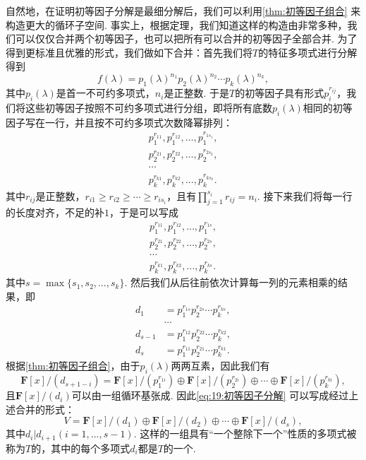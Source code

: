 自然地，在证明初等因子分解是最细分解后，我们可以利用\autoref{thm:初等因子组合} 来构造更大的循环子空间. 事实上，根据定理，我们知道这样的构造由非常多种，我们可以仅仅合并两个初等因子，也可以把所有可以合并的初等因子全部合并. 为了得到更标准且优雅的形式，我们做如下合并：首先我们将$T$的特征多项式进行分解得到
\[f(\lambda)=p_1(\lambda)^{n_1}p_2(\lambda)^{n_2}\cdots p_k(\lambda)^{n_k},\]
其中$p_i(\lambda)$是首一不可约多项式，$n_i$是正整数. 于是$T$的初等因子具有形式$p_i^{r_{ij}}$，我们将这些初等因子按照不可约多项式进行分组，即将所有底数$p_i(\lambda)$相同的初等因子写在一行，并且按不可约多项式次数降幂排列：
\begin{gather*}
    p_1^{r_{11}},p_1^{r_{12}},\ldots,p_1^{r_{1s_1}}, \\
    p_2^{r_{21}},p_2^{r_{22}},\ldots,p_2^{r_{2s_2}}, \\
    \cdots \\
    p_k^{r_{k1}},p_k^{r_{k2}},\ldots,p_k^{r_{ks_k}}.
\end{gather*}
其中$r_{ij}$是正整数，$r_{i1}\geqslant r_{i2}\geqslant\cdots\geqslant r_{is_i}$，且有$\prod\limits_{j=1}^{s_i}r_{ij}=n_i$. 接下来我们将每一行的长度对齐，不足的补$1$，于是可以写成
\begin{gather*}
    p_1^{r_{11}},p_1^{r_{12}},\ldots,p_1^{r_{1s}}, \\
    p_2^{r_{21}},p_2^{r_{22}},\ldots,p_2^{r_{2s}}, \\
    \cdots \\
    p_k^{r_{k1}},p_k^{r_{k2}},\ldots,p_k^{r_{ks}}.
\end{gather*}
其中$s=\max\{s_1,s_2,\ldots,s_k\}$. 然后我们从后往前依次计算每一列的元素相乘的结果，即
\begin{align*}
    d_1     & =p_1^{r_{1s}}p_2^{r_{2s}}\cdots p_k^{r_{ks}}, \\
            & \cdots                                        \\
    d_{s-1} & =p_1^{r_{12}}p_2^{r_{22}}\cdots p_k^{r_{k2}}, \\
    d_s     & =p_1^{r_{11}}p_2^{r_{21}}\cdots p_k^{r_{k1}}.
\end{align*}
根据\autoref{thm:初等因子组合}，由于$p_i(\lambda)$两两互素，因此我们有
\[\mathbf{F}[x]/(d_{s+1-i})=\mathbf{F}[x]/(p_1^{r_{1i}})\oplus\mathbf{F}[x]/(p_2^{r_{2i}})\oplus\cdots\oplus\mathbf{F}[x]/(p_k^{r_{ki}}),\]
且$\mathbf{F}[x]/(d_i)$可以由一组循环基张成. 因此\autoref{eq:19:初等因子分解} 可以写成经过上述合并的形式：
\begin{equation} \label{eq:20:不变因子分解}
    V=\mathbf{F}[x]/(d_1)\oplus\mathbf{F}[x]/(d_2)\oplus\cdots\oplus\mathbf{F}[x]/(d_s),
\end{equation}
其中$d_i|d_{i+1}(i=1,\ldots,s-1)$. 这样的一组具有``一个整除下一个''性质的多项式被称为$T$的，其中的每个多项式$d_i$都是$T$的一个.


